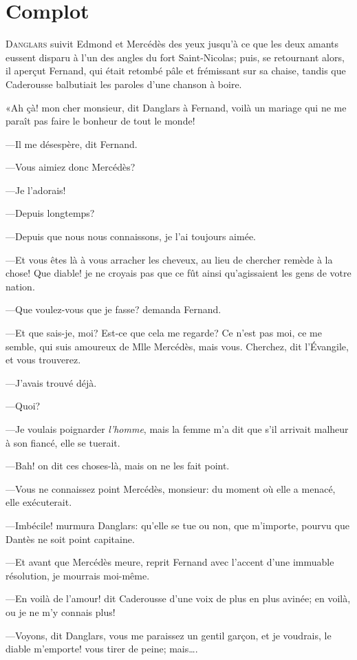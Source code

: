 \chapter{Complot}

\lettrine{D}{anglars} suivit Edmond et Mercédès des yeux jusqu'à ce que les deux amants eussent disparu à l'un des angles du fort Saint-Nicolas; puis, se retournant alors, il aperçut Fernand, qui était retombé pâle et frémissant sur sa chaise, tandis que Caderousse balbutiait les paroles d'une chanson à boire.

«Ah çà! mon cher monsieur, dit Danglars à Fernand, voilà un mariage qui ne me paraît pas faire le bonheur de tout le monde!

—Il me désespère, dit Fernand.

—Vous aimiez donc Mercédès?

—Je l'adorais!

—Depuis longtemps?

—Depuis que nous nous connaissons, je l'ai toujours aimée.

—Et vous êtes là à vous arracher les cheveux, au lieu de chercher remède à la chose! Que diable! je ne croyais pas que ce fût ainsi qu'agissaient les gens de votre nation.

—Que voulez-vous que je fasse? demanda Fernand.

—Et que sais-je, moi? Est-ce que cela me regarde? Ce n'est pas moi, ce me semble, qui suis amoureux de Mlle Mercédès, mais vous. Cherchez, dit l'Évangile, et vous trouverez.

—J'avais trouvé déjà.

—Quoi?

—Je voulais poignarder \textit{l'homme}, mais la femme m'a dit que s'il arrivait malheur à son fiancé, elle se tuerait.

—Bah! on dit ces choses-là, mais on ne les fait point.

—Vous ne connaissez point Mercédès, monsieur: du moment où elle a menacé, elle exécuterait.

—Imbécile! murmura Danglars: qu'elle se tue ou non, que m'importe, pourvu que Dantès ne soit point capitaine.

—Et avant que Mercédès meure, reprit Fernand avec l'accent d'une immuable résolution, je mourrais moi-même.

—En voilà de l'amour! dit Caderousse d'une voix de plus en plus avinée; en voilà, ou je ne m'y connais plus!

—Voyons, dit Danglars, vous me paraissez un gentil garçon, et je voudrais, le diable m'emporte! vous tirer de peine; mais\dots.


